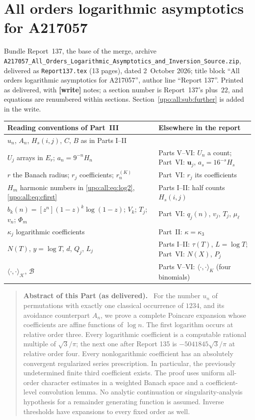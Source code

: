 \documentclass[11pt,letterpaper]{article}
\theoremstyle{remark}\newtheorem{remark}[theorem]{Remark}
\numberwithin{equation}{section}
\newcommand{\B}{\mathcal B}
\newcommand{\bfU}{\boldsymbol u}
\newcommand{\file}[1]{\nolinkurl{#1}}
\newenvironment{partabstract}{\begin{quote}\small\noindent\textbf{Abstract of this Part (as delivered).}\ }{\end{quote}}
\newcommand{\partsource}[1]{\par\noindent\begin{minipage}{\textwidth}\small #1\end{minipage}\par\medskip}
\begin{document}
\part{All orders logarithmic asymptotics for A217057}\label{upo:all:part}
\partsource{Bundle Report~137, the base of the merge, archive \file{A217057_All_Orders_Logarithmic_Asymptotics_and_Inversion_Source.zip}, delivered as \file{Report137.tex} (13 pages), dated 2~October 2026; title block ``All orders logarithmic asymptotics for A217057'', author line ``Report 137''. Printed as delivered, with \textbf{[write]} notes; a section number is Report~137's plus~$22$, and equations are renumbered within sections. Section~\ref{upo:all:sub:further} is added in the write.}
\begin{center}
\small
\begin{tabular}{@{}>{\raggedright\arraybackslash}p{} >{\raggedright\arraybackslash}p{}@{}}
\toprule
Reading conventions of Part~III & Elsewhere in the report\\
\midrule
$u_n$, $A_n$, $H_s(i,j)$, $C$, $B$ as in Parts I--II & \\
$U_j$ arrays in $E_r$; $a_n=9^{-n}H_n$ & Parts V--VI: $U_n$ a count; Part~VI: $\bfU_j$, $a_s=16^{-s}H_s$\\
$r$ the Banach radius; $r_j$ coefficients; $r_n^{(K)}$ & Part~VI: $r_j$ its coefficients\\
$H_m$ harmonic numbers in \eqref{upo:all:eq:log2}, \eqref{upo:all:eq:cfirst} & Parts I--II: half counts $H_s(i,j)$\\
$b_k(n)=[z^n](1-z)^k\log(1-z)$; $V_k$; $T_j$; $v_n$; $\Phi_m$ & Part~VI: $q_j(n)$, $v_j$, $T_j$, $\mu_\ell$\\
$\kappa_j$ logarithmic coefficients & Part~II: $\kappa=\kappa_3$\\
$N(T)$, $y=\log T$, $d$, $Q_j$, $L_j$ & Parts I--II: $\tau(T)$, $L=\log T$; Part~VI: $N(X)$, $P_j$\\
$\langle\cdot,\cdot\rangle_{\mathcal K}$, $\B$ & Parts V--VI: $\langle\cdot,\cdot\rangle_K$ (four binomials)\\
\bottomrule
\end{tabular}
\end{center}
\begin{partabstract}
For the number $u_n$ of permutations with exactly one classical occurrence
of $1234$, and its avoidance counterpart $A_n$, we prove a complete
Poincare expansion whose coefficients are affine functions of $\log n$.
The first logarithm occurs at relative order three. Every logarithmic
coefficient is a computable rational multiple of $\sqrt3/\pi$; the next
one after Report 135 is $-5041845\sqrt3/\pi$ at relative order four.
Every nonlogarithmic coefficient has an absolutely convergent regularized
series prescription. In particular, the previously undetermined finite
third coefficient exists. The proof uses uniform all-order character
estimates in a weighted Banach space and a coefficient-level convolution
lemma. No analytic continuation or singularity-analysis hypothesis for
a remainder generating function is assumed. Inverse thresholds have
expansions to every fixed order as well.
\end{partabstract}
\end{document}
